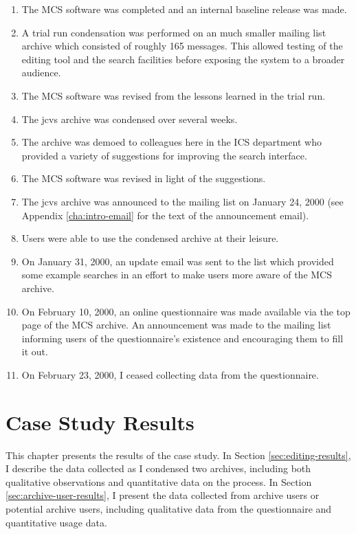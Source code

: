 \begin{enumerate}
\item The MCS software was completed and an internal baseline release was made.
\item A trial run condensation was performed on an much smaller mailing list
  archive which consisted of roughly 165 messages. This allowed testing of the
  editing tool and the search facilities before exposing the system to a
  broader audience.
\item The MCS software was revised from the lessons learned in the trial run.
\item The jcvs archive was condensed over several weeks.
\item The archive was demoed to colleagues here in the ICS department who
  provided a variety of suggestions for improving the search interface.
\item The MCS software was revised in light of the suggestions.
\item The jcvs archive was announced to the mailing list on January 24, 2000
  (see Appendix \ref{cha:intro-email} for the text of the announcement email).
\item Users were able to use the condensed archive at their leisure.
\item On January 31, 2000, an update email was sent to the list which provided
  some example searches in an effort to make users more aware of the MCS
  archive.
\item On February 10, 2000, an online questionnaire was made available via the
  top page of the MCS archive. An announcement was made to the mailing list
  informing users of the questionnaire's existence and encouraging them to fill
  it out.
\item On February 23, 2000, I ceased collecting data from the questionnaire.
\end{enumerate}


\chapter{Case Study Results}
\label{cha:case-study-results}
This chapter presents the results of the case study. In Section
\ref{sec:editing-results}, I describe the data collected as I condensed two
archives, including both qualitative observations and quantitative data on the
process. In Section \ref{sec:archive-user-results}, I present the data
collected from archive users or potential archive users, including qualitative
data from the questionnaire and quantitative usage data.

